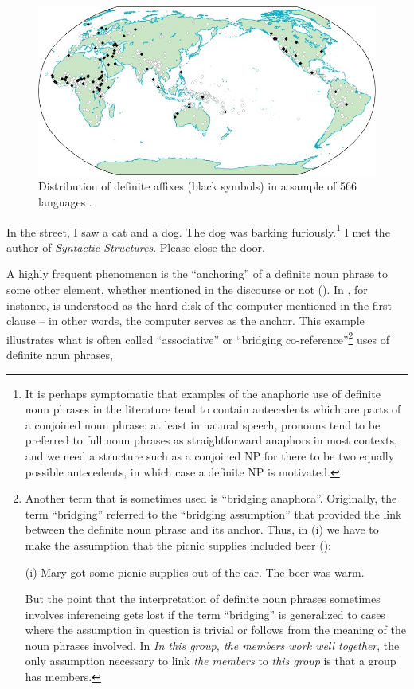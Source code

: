 \begin{figure}
\includegraphics[height=.35\textheight]{figures/11_DistributionDefAffixes}
\caption{Distribution of definite affixes (black symbols) in a sample of 566 languages \citep{Dryer2005}.}
\label{map:8b}
\end{figure}

\ea 
	\gl	\label{bkm:Ref93745057}In the street, I saw a cat and a dog. The dog was barking furiously.\footnote{ It is perhaps symptomatic that examples of the anaphoric use of definite noun phrases in the literature tend to contain antecedents which are parts of a conjoined noun phrase: at least in natural speech, pronouns tend to be preferred to full noun phrases as straightforward anaphors in most contexts, and we need a structure such as a conjoined NP for there to be two equally possible antecedents, in which case a definite NP is motivated.}
\z 
\ea 
	\gl	\label{bkm:Ref93745078}I met the author of \textit{Syntactic Structures}.
\z 
\ea 
	\gl \label{bkm:Ref93745091}Please close the door. 
\z 

A highly frequent phenomenon is the “anchoring” of a definite noun phrase to some other element, whether mentioned in the discourse or not (\citet[25]{Fraurud1992}). In , for instance,  is understood as the hard disk of the computer mentioned in the first clause – in other words, the computer serves as the anchor.  This example illustrates what is often called “associative” or “bridging co-reference”\footnote{ Another term that is sometimes used is “bridging anaphora”. Originally, the term “bridging” referred to the “bridging assumption” that provided the link between the definite noun phrase and its anchor. Thus, in (i) we have to make the assumption that the picnic supplies included beer (\citet{ClarkEtAl1974}):\par (i) Mary got some picnic supplies out of the car. The beer was warm. \par But the point that the interpretation of definite noun phrases sometimes involves inferencing gets lost if the term “bridging” is generalized to cases where the assumption in question is trivial or follows from the meaning of the noun phrases involved. In \textit{In this group, the members work well together}, the only assumption necessary to link \textit{the members} to \textit{this group} is that a group has members. } uses of definite noun phrases,

